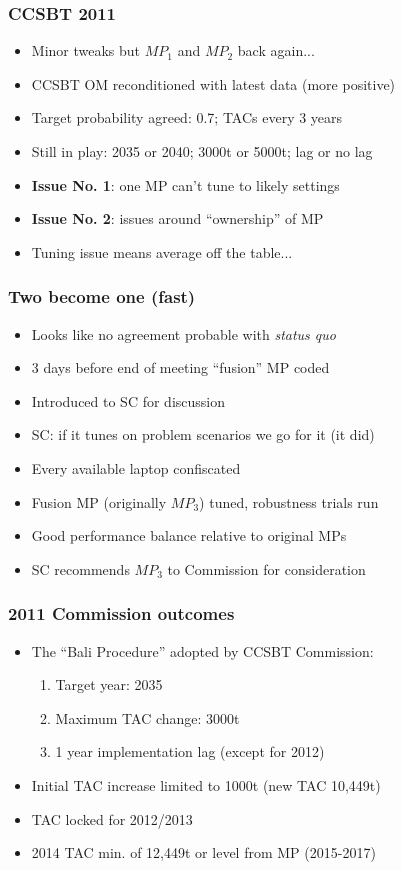 \documentclass{beamer}
\begin{document}
\begin{frame}
    \frametitle{CCSBT 2011}
\begin{itemize}
    \item Minor tweaks but $MP_1$ and $MP_2$ back again...
    \item CCSBT OM reconditioned with latest data (more positive)
    \item Target probability agreed: 0.7; TACs every 3 years
    \item Still in play: 2035 or 2040; 3000t or 5000t; lag or no lag
    \item \textbf{Issue No. 1}: one MP can't tune to likely settings
    \item \textbf{Issue No. 2}: issues around ``ownership'' of MP
    \item Tuning issue means average off the table...
\end{itemize}
\end{frame}
\begin{frame}
    \frametitle{Two become one (fast)}
\begin{itemize}
    \item Looks like no agreement probable with \textit{status quo}
    \item 3 days before end of meeting ``fusion'' MP coded
    \item Introduced to SC for discussion
    \item SC: if it tunes on problem scenarios we go for it (it did)
    \item Every available laptop confiscated
    \item Fusion MP (originally $MP_3$) tuned, robustness trials run
    \item Good performance balance relative to original MPs
    \item SC recommends $MP_3$ to Commission for consideration
\end{itemize}
\end{frame}
\begin{frame}
    \frametitle{2011 Commission outcomes}
\begin{itemize}
    \item The ``Bali Procedure'' adopted by CCSBT Commission:
        \begin{enumerate}
            \item Target year: 2035
            \item Maximum TAC change: 3000t
            \item 1 year implementation lag (except for 2012)
         \end{enumerate}
     \item Initial TAC increase limited to 1000t (new TAC 10,449t)
     \item TAC locked for 2012/2013 
     \item 2014 TAC min. of 12,449t or level from MP (2015-2017)
\end{itemize}
\end{frame}
\end{document}
